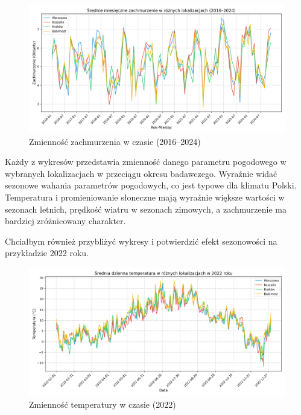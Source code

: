 \begin{figure}[H]
    \centering
    \includegraphics[width=\textwidth]{../plots/weather/cloud_cover_time_series_full.png}
    \caption{Zmienność zachmurzenia w czasie (2016–2024)}
    \label{fig:cloud-cover-time-series-full}
\end{figure}

Każdy z wykresów przedstawia zmienność danego parametru pogodowego w wybranych lokalizacjach w przeciągu okresu badawczego. Wyraźnie widać sezonowe wahania parametrów pogodowych, co jest typowe dla klimatu Polski. Temperatura i promieniowanie słoneczne mają wyraźnie większe wartości w sezonach letnich, prędkość wiatru w sezonach zimowych, a zachmurzenie ma bardziej zróżnicowany charakter.

Chciałbym również przybliżyć wykresy i potwierdzić efekt sezonowości na przykładzie 2022 roku. 

\begin{figure}[H]
    \centering
    \includegraphics[width=\textwidth]{../plots/weather/temp_time_series_2022.png}
    \caption{Zmienność temperatury w czasie (2022)}
    \label{fig:temp-time-series-2022}
\end{figure}

